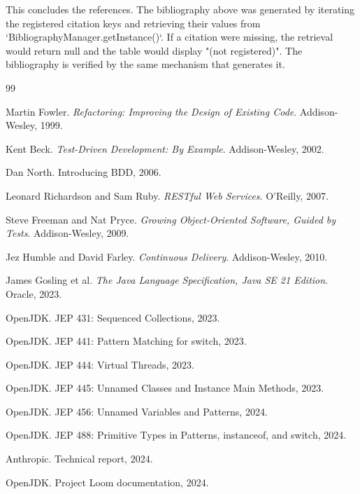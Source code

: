 \documentclass[11pt]{article}
\begin{document}
This concludes the references. The bibliography above was generated by iterating the registered citation keys and retrieving their values from `BibliographyManager.getInstance()`. If a citation were missing, the retrieval would return null and the table would display "(not registered)". The bibliography is verified by the same mechanism that generates it.


\begin{thebibliography}{99}

Martin Fowler. \textit{Refactoring: Improving the Design of Existing Code}. Addison-Wesley, 1999.

Kent Beck. \textit{Test-Driven Development: By Example}. Addison-Wesley, 2002.

Dan North. Introducing BDD, 2006.

Leonard Richardson and Sam Ruby. \textit{RESTful Web Services}. O'Reilly, 2007.

Steve Freeman and Nat Pryce. \textit{Growing Object-Oriented Software, Guided by Tests}. Addison-Wesley, 2009.

Jez Humble and David Farley. \textit{Continuous Delivery}. Addison-Wesley, 2010.

James Gosling et al. \textit{The Java Language Specification, Java SE 21 Edition}. Oracle, 2023.

OpenJDK. JEP 431: Sequenced Collections, 2023.

OpenJDK. JEP 441: Pattern Matching for switch, 2023.

OpenJDK. JEP 444: Virtual Threads, 2023.

OpenJDK. JEP 445: Unnamed Classes and Instance Main Methods, 2023.

OpenJDK. JEP 456: Unnamed Variables and Patterns, 2024.

OpenJDK. JEP 488: Primitive Types in Patterns, instanceof, and switch, 2024.

Anthropic. Technical report, 2024.

OpenJDK. Project Loom documentation, 2024.

\end{thebibliography}
\end{document}
